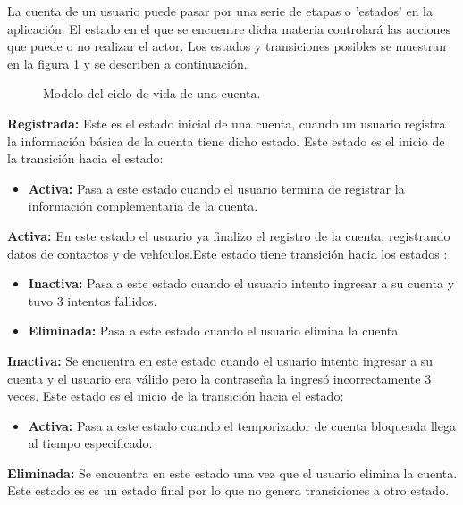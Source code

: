 La cuenta de un usuario puede pasar por una serie de etapas o 'estados' en la aplicación. El estado en el que se encuentre dicha materia controlará las acciones que puede o no realizar el actor. Los estados y transiciones posibles se muestran en la figura \ref{fig:maq:cuenta} y se describen a continuación.\\

\begin{figure}[htbp!]
	\centering
	\caption{Modelo del ciclo de vida de una cuenta.}
	\label{fig:maq:cuenta}
\end{figure}

\noindent \textbf{Registrada:} Este es el estado inicial de una cuenta, cuando un usuario registra la información básica de la cuenta tiene dicho estado. Este estado es el inicio de la transición hacia el estado:
\begin{itemize}
	
	\item \textbf{Activa:} Pasa a este estado cuando el usuario termina de registrar la información complementaria de la cuenta.
	
\end{itemize}

\noindent \textbf{Activa:} En este estado el usuario ya finalizo el registro de la cuenta, registrando datos de contactos y de vehículos.Este estado tiene transición hacia los estados :
\begin{itemize}
	
	\item \textbf{Inactiva:} Pasa a este estado cuando el usuario intento ingresar a su cuenta y tuvo 3 intentos fallidos.
	\item \textbf{Eliminada:} Pasa a este estado cuando el usuario elimina la cuenta. 
\end{itemize}

\noindent \textbf{Inactiva:} Se encuentra en este estado cuando el usuario intento ingresar a su cuenta y el usuario era válido pero la contraseña la ingresó incorrectamente 3 veces. Este estado es el inicio de la transición hacia el estado:
\begin{itemize}
	
	\item \textbf{Activa:} Pasa a este estado cuando el temporizador de cuenta bloqueada llega al tiempo especificado.
	
\end{itemize}

\noindent \textbf{Eliminada:} Se encuentra en este estado una vez que el usuario elimina la cuenta. Este estado es es un estado final por lo que no genera transiciones a otro estado.
